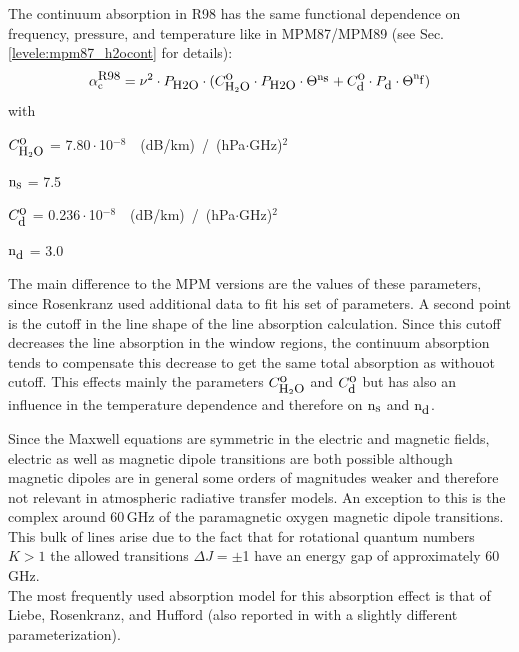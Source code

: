 {
\label{levele:pwr98_h2ocont}
The continuum absorption in R98 has the same functional dependence on frequency,
pressure, and temperature like in MPM87/MPM89 (see Sec. \ref{levele:mpm87_h2ocont}
for details):
\begin{equation} 
  \label{eq:pwr98:abscont}
  \alpha^{\mbox{\rm \small R98}}_{\rm c} = \nu^2 \cdot P_{\mbox{\rm \small H2O}} \cdot 
               (C^{\mbox{\rm o}}_{\mbox{\rm \small H}_{2}\mbox{\rm \small O}} \cdot P_{\mbox{\rm \small H2O}} \cdot \Theta^{{\rm n}_{\mbox{\rm \small s}}} + 
                C^{\mbox{\rm o}}_{\mbox{\rm \small d}} \cdot P_{\mbox{\rm \small d}}  \cdot \Theta^{{\rm n}_{\mbox{\rm \small f}}})
\end{equation}
with
\begin{description}
\item{$C^{\mbox{\rm o}}_{\mbox{\rm \small H}_{2}\mbox{\rm \small O}}$}   = 7.80\,$\cdot$\,10$^{-8}$~~(dB/km)~/~(hPa$\cdot$GHz)$^2$
\item{${\rm n}_{\mbox{\rm \small s}}$}    = 7.5
\item{$C^{\mbox{\rm o}}_{\mbox{\rm \small d}}$}   =  0.236\,$\cdot$\,10$^{-8}$~~(dB/km)~/~(hPa$\cdot$GHz)$^2$
\item{${\rm n}_{\mbox{\rm \small d}}$}    = 3.0
\end{description}
The main difference to the MPM versions are the values of these 
parameters, since Rosenkranz used additional data to fit his set of 
parameters. A second point is the cutoff in the line shape of the line 
absorption calculation. Since this cutoff decreases the line absorption 
in the window regions, the continuum absorption tends to compensate this 
decrease to get the same total absorption as withouot cutoff. This effects 
mainly the parameters $C^{\mbox{\rm o}}_{\mbox{\rm \small H}_{2}\mbox{\rm \small O}}$ and $C^{\mbox{\rm o}}_{\mbox{\rm \small d}}$ but has also an influence in the 
temperature dependence and therefore on ${\rm n}_{\mbox{\rm \small s}}$ and ${\rm n}_{\mbox{\rm \small d}}$.




\label{levelc:02_models}
%
Since the Maxwell equations are symmetric in the electric and
magnetic fields, electric as well as magnetic dipole transitions 
are both possible although magnetic dipoles are in general some
orders of magnitudes weaker and therefore not relevant in
atmospheric radiative transfer models. An exception to this is the complex 
around 60\,GHz of the paramagnetic oxygen magnetic dipole transitions. 
This bulk of lines arise due to the fact that for rotational 
quantum numbers $K>1$ the allowed transitions \mbox{$\Delta J = \pm$1} 
have an energy gap of approximately 60\,GHz.\\
The most frequently used absorption model for this absorption effect is that of
Liebe, Rosenkranz, and Hufford \cite{liebeetal:92} (also reported in 
\cite{pwr:93} with a slightly different parameterization).

}
